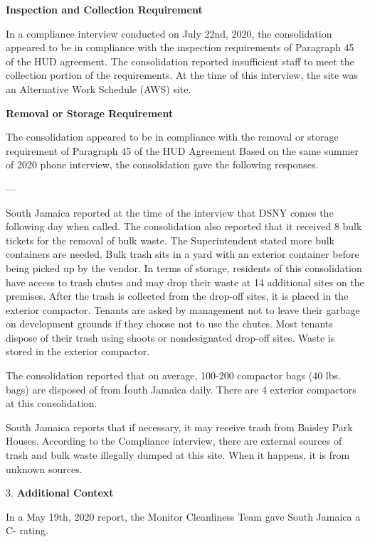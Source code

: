 

\textbf{Inspection and Collection Requirement}

In a compliance interview conducted on July 22nd, 2020, the consolidation appeared to be in compliance with the inspection requirements of Paragraph 45 of the HUD agreement. The consolidation reported insufficient staff to meet the collection portion of the requirements. At the time of this interview, the site was an Alternative Work Schedule (AWS) site. 

\textbf{Removal or Storage Requirement}

The consolidation appeared to be in compliance with the  removal or storage requirement of Paragraph  45 of the HUD Agreement Based on the same summer of  2020 phone interview, the consolidation gave the following responses.

---

South Jamaica reported at the time of the interview that DSNY comes the following day when called. The consolidation also reported that it received 8 bulk tickets for the removal of bulk waste. The Superintendent stated more bulk containers are needed. Bulk trash sits in a yard with an exterior container before being picked up by the vendor. In terms of storage, residents of this consolidation have access to trash chutes and may drop their waste at 14 additional sites on the premises. After the trash is collected from the drop-off sites, it is placed in the exterior compactor. Tenants are asked by management not to leave their garbage on development grounds if they choose not to use the chutes. Most tenants dispose of their trash using shoots or nondesignated drop-off sites. Waste is stored in the exterior compactor. 

The consolidation reported that on average, 100-200 compactor bags (40 lbs. bags) are disposed of from Íouth Jamaica daily. There are 4 exterior compactors at this consolidation.

South Jamaica reports that if necessary, it may receive trash from Baisley Park Houses. According to the Compliance interview, there are external sources of trash and bulk waste illegally dumped at this site. When it happens, it is from unknown sources. 

3. \textbf{Additional Context} 

In a May 19th, 2020 report, the Monitor Cleanliness Team gave South Jamaica a C- rating. 